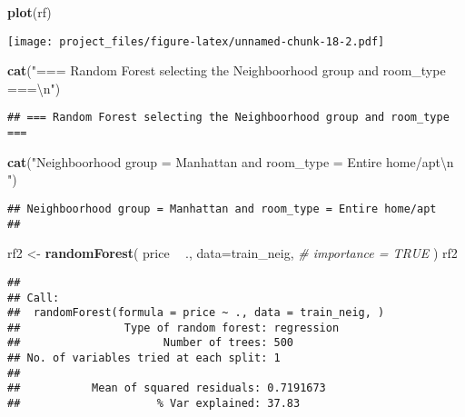 \documentclass[
]{article}
\newenvironment{Shaded}{\begin{snugshade}}{\end{snugshade}}
\newcommand{\CharTok}[1]{\textcolor[rgb]{0.31,0.60,0.02}{#1}}
\newcommand{\CommentTok}[1]{\textcolor[rgb]{0.56,0.35,0.01}{\textit{#1}}}
\newcommand{\DataTypeTok}[1]{\textcolor[rgb]{0.13,0.29,0.53}{#1}}
\newcommand{\KeywordTok}[1]{\textcolor[rgb]{0.13,0.29,0.53}{\textbf{#1}}}
\newcommand{\NormalTok}[1]{#1}
\newcommand{\OperatorTok}[1]{\textcolor[rgb]{0.81,0.36,0.00}{\textbf{#1}}}
\newcommand{\StringTok}[1]{\textcolor[rgb]{0.31,0.60,0.02}{#1}}
\begin{document}
\begin{Shaded}
\begin{Highlighting}[]
\KeywordTok{plot}\NormalTok{(rf)}
\end{Highlighting}
\end{Shaded}

\texttt{[image: project\_files/figure-latex/unnamed-chunk-18-2.pdf]}

\begin{Shaded}
\begin{Highlighting}[]
\KeywordTok{cat}\NormalTok{(}\StringTok{"=== Random Forest selecting the Neighboorhood group and room_type ===}\CharTok{\textbackslash{}n}\StringTok{"}\NormalTok{)}
\end{Highlighting}
\end{Shaded}

\begin{verbatim}
## === Random Forest selecting the Neighboorhood group and room_type ===
\end{verbatim}

\begin{Shaded}
\begin{Highlighting}[]
\KeywordTok{cat}\NormalTok{(}\StringTok{"Neighboorhood group = Manhattan and room_type = Entire home/apt}\CharTok{\textbackslash{}n}\StringTok{ "}\NormalTok{)}
\end{Highlighting}
\end{Shaded}

\begin{verbatim}
## Neighboorhood group = Manhattan and room_type = Entire home/apt
## 
\end{verbatim}

\begin{Shaded}
\begin{Highlighting}[]
\NormalTok{rf2 <-}\StringTok{ }\KeywordTok{randomForest}\NormalTok{(}
\NormalTok{  price }\OperatorTok{~}\StringTok{ }\NormalTok{.,}
  \DataTypeTok{data=}\NormalTok{train_neig,}
  \CommentTok{# importance = TRUE}
\NormalTok{)}
\NormalTok{rf2}
\end{Highlighting}
\end{Shaded}

\begin{verbatim}
## 
## Call:
##  randomForest(formula = price ~ ., data = train_neig, ) 
##                Type of random forest: regression
##                      Number of trees: 500
## No. of variables tried at each split: 1
## 
##           Mean of squared residuals: 0.7191673
##                     % Var explained: 37.83
\end{verbatim}
\end{document}
